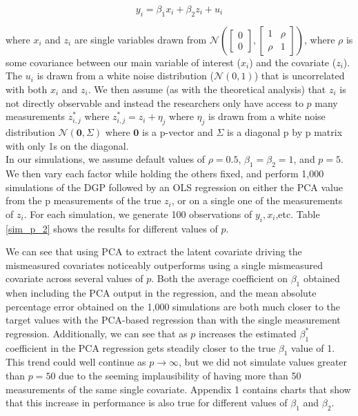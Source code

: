 \documentclass[12pt]{article}
\begin{document}
        $$y_i = \beta_1 x_i + \beta_2 z_i + u_i$$

        where $x_i$ and $z_i$ are single variables drawn from $\mathcal{N}(\begin{bmatrix} 0\\ 0 \end{bmatrix}, \begin{bmatrix} 1 & \rho\\ \rho & 1\end{bmatrix})$, where $\rho$ is some covariance between our main variable of interest ($x_i$) and the covariate ($z_i$). The $u_i$ is drawn from a white noise distribution ($\mathcal{N}(0,1)$) that is uncorrelated with both $x_i$ and $z_i$. We then assume (as with the theoretical analysis) that $z_i$ is not directly observable and instead the researchers only have access to $p$ many measurements $z_{i,j}^*$ where $z_{i,j}^* = z_i + \eta_j$ where $\eta_j$ is drawn from a white noise distribution $\mathcal{N}(\mathbf{0},\Sigma)$ where $\mathbf{0}$ is a p-vector and $\Sigma$ is a diagonal p by p matrix with only 1s on the diagonal.\\
        
        In our simulations, we assume default values of $\rho = 0.5$, $\beta_1 = \beta_2 = 1$, and $p=5$. We then vary each factor while holding the others fixed, and perform 1,000 simulations of the DGP followed by an OLS regression on either the PCA value from the p measurements of the true $z_i$, or on a single one of the measurements of $z_i$. For each simulation, we generate 100 observations of $y_i,x_i$,etc. Table \ref{sim_p_2} shows the results for different values of $p$.

        \clearpage

        

        We can see that using PCA to extract the latent covariate driving the mismeasured covariates noticeably outperforms using a single mismeasured covariate across several values of $p$. Both the average coefficient on $\beta_1$ obtained when including the PCA output in the regression, and the mean absolute percentage error obtained on the 1,000 simulations are both much closer to the target values with the PCA-based regression than with the single measurement regression. Additionally, we can see that as $p$ increases the estimated $\beta_1^*$ coefficient in the PCA regression gets steadily closer to the true $\beta_1$ value of 1. This trend could well continue as $p \to \infty$, but we did not simulate values greater than $p = 50$ due to the seeming implausibility of having more than 50 measurements of the same single covariate. Appendix 1 contains charts that show that this increase in performance is also true for different values of $\beta_1$ and $\beta_2$.\\
\end{document}
